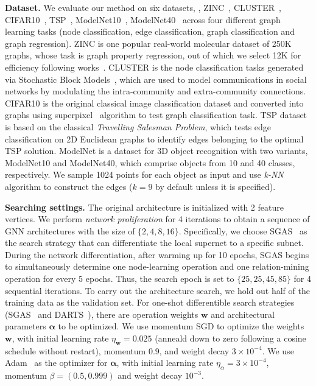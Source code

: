 \noindent
\textbf{Dataset. }
We evaluate our method on six datasets, \ie, ZINC~\cite{ZINC}, CLUSTER~\cite{bench}, CIFAR10~\cite{CIFAR10}, TSP~\cite{bench}, ModelNet10~\cite{ModelNet}, ModelNet40~\cite{ModelNet} across four different graph learning tasks (node classification, edge classification, graph classification and graph regression). 
ZINC is one popular real-world molecular dataset of 250K graphs, whose task is graph property regression, out of which we select 12K for efficiency following works~\cite{Cai2021RethinkingGN, PNA, bench}. 
CLUSTER is the node classification tasks generated via Stochastic Block Models~\cite{SBM}, which are used to model communications in social networks by modulating the intra-community and extra-community connections. 
CIFAR10 is the original classical image classification dataset and converted into graphs using superpixel~\cite{SLIC} algorithm to test graph classification task. 
TSP dataset is based on the classical \emph{Travelling Salesman Problem}, which tests edge classification on 2D Euclidean graphs to identify edges belonging to the optimal TSP solution. 
ModelNet is a dataset for 3D object recognition with two variants, ModelNet10 and ModelNet40, which comprise objects from 10 and 40 classes, respectively. 
We sample 1024 points for each object as input and use \emph{k-NN} algorithm to construct the edges ($k = 9$ by default unless it is specified). 



\noindent
\textbf{Searching settings. }
The original architecture is initialized with 2 feature vertices. 
We perform \emph{network proliferation} for 4 iterations to obtain a sequence of GNN architectures with the size of $\{2,4,8,16\}$. 
Specifically, we choose SGAS~\cite{SGAS} as the search strategy that can differentiate the local supernet to a specific subnet. 
During the network differentiation, after warming up for 10 epochs, SGAS begins to simultaneously determine one node-learning operation and one relation-mining operation for every 5 epochs. 
Thus, the search epoch is set to $\{25, 25, 45, 85\}$ for 4 sequential iterations. 
To carry out the architecture search, we hold out half of the training data as the validation set. 
For one-shot differentible search strategies (SGAS~\cite{SGAS} and DARTS~\cite{DARTS}), there are operation weights $\bm{w}$ and architectural parameters $\bm{\alpha}$ to be optimized. 
We use momentum SGD to optimize the weights $\bm{w}$, with initial learning rate $\eta_{\bm{w}}=0.025$ (anneald down to zero following a cosine schedule without restart), momentum $0.9$, and weight decay $3 \times 10^{-4}$. 
We use Adam~\cite{ADAM} as the optimizer for $\bm{\alpha}$, with initial learning rate $\eta_{\alpha} = 3 \times 10^{-4}$, momentum $\beta = (0.5, 0.999)$ and weight decay $10^{-3}$. 



